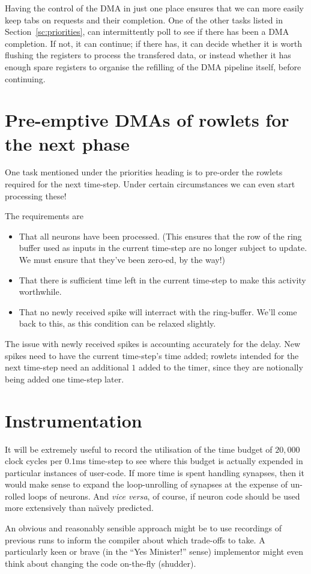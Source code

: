 Having the control of the DMA in just one place ensures that we can
more easily keep tabs on requests and their completion. One of the
other tasks listed in Section~\ref{sc:priorities}, can intermittently
poll to see if there has been a DMA completion. If not, it can
continue; if there has, it can decide whether it is worth flushing the
registers to process the transfered data, or instead whether it has
enough spare registers to organise the refilling of the DMA pipeline
itself, before continuing.

\section{Pre-emptive DMAs of rowlets for the next phase}

One task mentioned under the priorities heading is to pre-order the
rowlets required for the next time-step. Under certain  circumstances
we can even start processing these!

The requirements are
\begin{itemize}
\item That all neurons have been processed. (This ensures that the row
  of the ring buffer used as inputs in the current time-step are no
  longer subject to update. We must ensure that they've been zero-ed,
  by the way!)
\item That there is sufficient time left in the current time-step to
  make this activity worthwhile.
\item That no newly received spike will interract with the
  ring-buffer. We'll come back to this, as this condition can be
  relaxed slightly.
\end{itemize}

The issue with newly received spikes is accounting accurately for the
delay. New spikes need to have the current time-step's time added;
rowlets intended for the next time-step need an additional $1$ added
to the timer, since they are notionally being added one time-step later.

\section{Instrumentation}

It will be extremely useful to record the utilisation of the time
budget of $20,000$ clock cycles per $0.1$ms time-step to see where
this budget is actually expended in particular instances of user-code. If more time
is spent handling synapses, then it would make sense to expand the
loop-unrolling of synapses at the expense of un-rolled loops of
neurons. And {\it vice versa}, of course, if neuron code should be
used more extensively than na\"{\i}vely predicted.

An obvious and reasonably sensible approach might be to use recordings
of previous runs to inform the compiler about which trade-offs to
take. A particularly keen or brave (in the ``Yes Minister!'' sense)
implementor might even think about changing the code on-the-fly (shudder).
